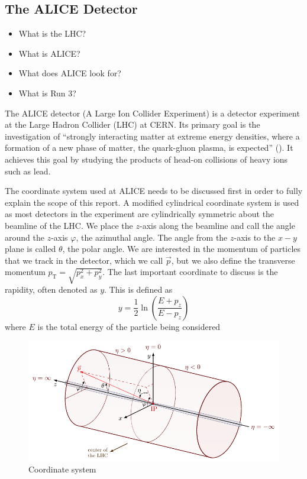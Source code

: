 \subsection{The ALICE Detector}
\begin{itemize}
    \item What is the LHC?
    \item What is ALICE?
    \item What does ALICE look for?
    \item What is Run 3?
\end{itemize}
The ALICE detector (A Large Ion Collider Experiment) is a detector experiment at the Large Hadron Collider (LHC) at CERN. Its primary goal is the investigation of ``strongly interacting matter at extreme energy densities, where a formation of a new phase of matter, the quark-gluon plasma, is expected'' (\cite{ALICE_LOI}). It achieves this goal by studying the products of head-on collisions of heavy ions such as lead. 



The coordinate system used at ALICE needs to be discussed first in order to fully explain the scope of this report. A modified cylindrical coordinate system is used as most detectors in the experiment are cylindrically symmetric about the beamline of the LHC. We place the $z$-axis along the beamline and call the angle around the $z$-axis $\varphi$, the azimuthal angle. The angle from the $z$-axis to the $x-y$ plane is called $\theta$, the polar angle. 
We are interested in the momentum of particles that we track in the detector, which we call $\vec{p}$, but we also define the transverse momentum $p_{\mathrm{T}}=\sqrt{p_x^2 + p_y^2}$. The last important coordinate to discuss is the rapidity, often denoted as $y$. This is defined as 
\begin{equation}
    y=\frac 12 \ln\left(\frac{E+p_z}{E-p_z}\right)
    \label{eqn:rapidity}
\end{equation}
where $E$ is the total energy of the particle being considered

\begin{figure}[h]
    \begin{center}
        \includegraphics[width=.8\textwidth]{Figs/coords.pdf}
        \caption{Coordinate system \cite{coords}}
        \label{fig:coords}
    \end{center}
\end{figure}


